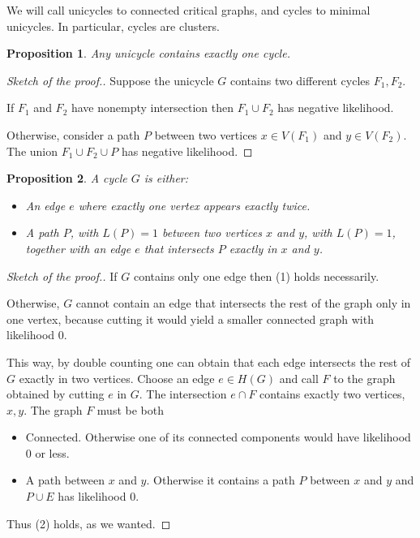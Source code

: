 \documentclass[11pt,notitlepage,a4paper]{article}
\newtheorem{proposition}{Proposition}[section]
\theoremstyle{definition}
\begin{document}
We will call unicycles to connected critical graphs, and cycles
to minimal unicycles. In particular, cycles are clusters. 

\begin{proposition}
	Any unicycle contains exactly one cycle. 
\end{proposition}
\begin{proof}[Sketch of the proof.]
 	Suppose the unicycle $G$ contains two different cycles $F_1,F_2$.
 	\item If $F_1$ and $F_2$ have nonempty intersection then $F_1\cup F_2$ 
 	has negative likelihood.
 	\item Otherwise, consider a path $P$ between two vertices $x\in V(F_1)$
 	and $y\in V(F_2)$. The union $F_1\cup F_2 \cup P$ has negative likelihood.
\end{proof}

\begin{proposition}
	A cycle $G$ is either:
	\begin{itemize}
		\item[(1)] An edge $e$ where exactly one vertex appears exactly
		twice.
		\item[(2)] A path $P$, with $L(P)=1$
		between two vertices $x$ and $y$, with
		$L(P)=1$, together with an edge $e$ that intersects $P$ exactly
		in $x$ and $y$.
	\end{itemize}
\end{proposition} 
\begin{proof}[Sketch of the proof.]
	\item If $G$ contains only one edge then (1) holds necessarily.
	
	\item Otherwise, $G$ cannot contain an edge that intersects the rest of the graph
	only in one vertex, because cutting it would yield a smaller connected 
	graph with likelihood $0$. 
	
	This way, by double counting one can obtain that 
	each edge intersects the rest of $G$ exactly in two vertices.
	Choose an edge $e\in H(G)$ and call $F$ to the graph obtained by
	cutting $e$ in $G$. The intersection $e\cap F$ contains exactly two 
	vertices, $x, y$. The graph $F$ must be both
	\begin{itemize}
		\item Connected. Otherwise one of its connected components would have
		likelihood $0$ or less.
		\item A path between $x$ and $y$. Otherwise it contains a path $P$ between
		$x$ and $y$ and $P\cup E$ has likelihood $0$. 
	\end{itemize} 
	Thus (2) holds, as we wanted. 
\end{proof}
\end{document}
